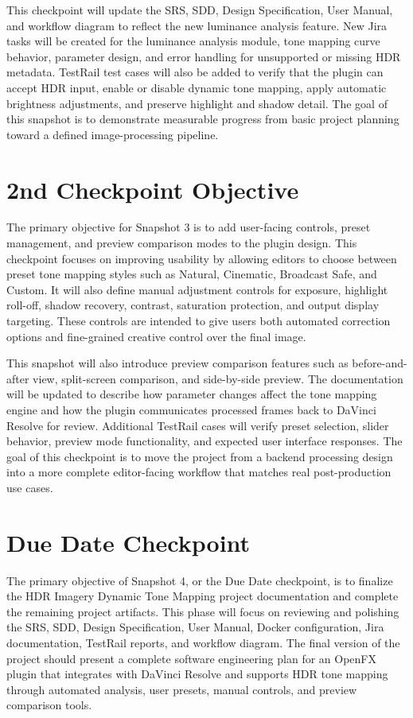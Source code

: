 \documentclass[12pt]{article}
\begin{document}
This checkpoint will update the SRS, SDD, Design Specification, User Manual, and workflow diagram to reflect the new luminance analysis feature. New Jira tasks will be created for the luminance analysis module, tone mapping curve behavior, parameter design, and error handling for unsupported or missing HDR metadata. TestRail test cases will also be added to verify that the plugin can accept HDR input, enable or disable dynamic tone mapping, apply automatic brightness adjustments, and preserve highlight and shadow detail. The goal of this snapshot is to demonstrate measurable progress from basic project planning toward a defined image-processing pipeline.

\section*{2nd Checkpoint Objective}

The primary objective for Snapshot 3 is to add user-facing controls, preset management, and preview comparison modes to the plugin design. This checkpoint focuses on improving usability by allowing editors to choose between preset tone mapping styles such as Natural, Cinematic, Broadcast Safe, and Custom. It will also define manual adjustment controls for exposure, highlight roll-off, shadow recovery, contrast, saturation protection, and output display targeting. These controls are intended to give users both automated correction options and fine-grained creative control over the final image.

This snapshot will also introduce preview comparison features such as before-and-after view, split-screen comparison, and side-by-side preview. The documentation will be updated to describe how parameter changes affect the tone mapping engine and how the plugin communicates processed frames back to DaVinci Resolve for review. Additional TestRail cases will verify preset selection, slider behavior, preview mode functionality, and expected user interface responses. The goal of this checkpoint is to move the project from a backend processing design into a more complete editor-facing workflow that matches real post-production use cases.

\section*{Due Date Checkpoint}

The primary objective of Snapshot 4, or the Due Date checkpoint, is to finalize the HDR Imagery Dynamic Tone Mapping project documentation and complete the remaining project artifacts. This phase will focus on reviewing and polishing the SRS, SDD, Design Specification, User Manual, Docker configuration, Jira documentation, TestRail reports, and workflow diagram. The final version of the project should present a complete software engineering plan for an OpenFX plugin that integrates with DaVinci Resolve and supports HDR tone mapping through automated analysis, user presets, manual controls, and preview comparison tools.
\end{document}

